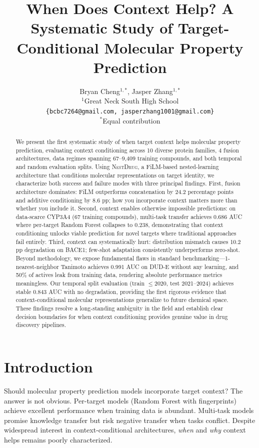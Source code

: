 \documentclass{article}
\title{When Does Context Help? A Systematic Study of Target-Conditional Molecular Property Prediction}
\author{Bryan Cheng$^{1,*}$, Jasper Zhang$^{1,*}$ \\
$^{1}$Great Neck South High School \\
\texttt{\{bcbc7264@gmail.com, jasperzhang1001@gmail.com\}} \\
$^{*}$Equal contribution
}
\newcommand{\methodname}{\textsc{NestDrug}}
\begin{document}
\maketitle
{}

\begin{abstract}
We present the first systematic study of when target context helps molecular property prediction, evaluating context conditioning across 10 diverse protein families, 4 fusion architectures, data regimes spanning 67--9,409 training compounds, and both temporal and random evaluation splits. Using \methodname{}, a FiLM-based nested-learning architecture that conditions molecular representations on target identity, we characterize both success and failure modes with three principal findings. First, fusion architecture dominates: FiLM outperforms concatenation by 24.2 percentage points and additive conditioning by 8.6 pp; how you incorporate context matters more than whether you include it. Second, context enables otherwise impossible predictions: on data-scarce CYP3A4 (67 training compounds), multi-task transfer achieves 0.686 AUC where per-target Random Forest collapses to 0.238, demonstrating that context conditioning unlocks viable prediction for novel targets where traditional approaches fail entirely. Third, context can systematically hurt: distribution mismatch causes 10.2 pp degradation on BACE1; few-shot adaptation consistently underperforms zero-shot. Beyond methodology, we expose fundamental flaws in standard benchmarking---1-nearest-neighbor Tanimoto achieves 0.991 AUC on DUD-E without any learning, and 50\% of actives leak from training data, rendering absolute performance metrics meaningless. Our temporal split evaluation (train $\leq$2020, test 2021--2024) achieves stable 0.843 AUC with no degradation, providing the first rigorous evidence that context-conditional molecular representations generalize to future chemical space. These findings resolve a long-standing ambiguity in the field and establish clear decision boundaries for when context conditioning provides genuine value in drug discovery pipelines.
\end{abstract}

\section{Introduction}
\label{sec:intro}

Should molecular property prediction models incorporate target context? The answer is not obvious. Per-target models (Random Forest with fingerprints) achieve excellent performance when training data is abundant. Multi-task models promise knowledge transfer but risk negative transfer when tasks conflict. Despite widespread interest in context-conditional architectures, \textit{when} and \textit{why} context helps remains poorly characterized.
\end{document}
